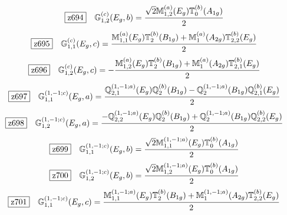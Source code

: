 \documentclass[fleqn,10pt,landscape]{jsarticle}
\begin{document}
\begin{dmath*}
\hspace*{3mm}\fbox{z694}\quad \mathbb{G}_{1,2}^{(c)}(E_{g},b)=\frac{\sqrt{2} \mathbb{M}_{1,2}^{(a)}(E_{g}) \mathbb{T}_{0}^{(b)}(A_{1g})}{2}
\end{dmath*}
\begin{dmath*}
\hspace*{3mm}\fbox{z695}\quad \mathbb{G}_{1,1}^{(c)}(E_{g},c)=\frac{\mathbb{M}_{1,1}^{(a)}(E_{g}) \mathbb{T}_{2}^{(b)}(B_{1g}) + \mathbb{M}_{1}^{(a)}(A_{2g}) \mathbb{T}_{2,2}^{(b)}(E_{g})}{2}
\end{dmath*}
\begin{dmath*}
\hspace*{3mm}\fbox{z696}\quad \mathbb{G}_{1,2}^{(c)}(E_{g},c)=- \frac{\mathbb{M}_{1,2}^{(a)}(E_{g}) \mathbb{T}_{2}^{(b)}(B_{1g}) + \mathbb{M}_{1}^{(a)}(A_{2g}) \mathbb{T}_{2,1}^{(b)}(E_{g})}{2}
\end{dmath*}
\begin{dmath*}
\hspace*{3mm}\fbox{z697}\quad \mathbb{G}_{1,1}^{(1,-1;c)}(E_{g},a)=\frac{\mathbb{Q}_{2,1}^{(1,-1;a)}(E_{g}) \mathbb{Q}_{2}^{(b)}(B_{1g}) - \mathbb{Q}_{2}^{(1,-1;a)}(B_{1g}) \mathbb{Q}_{2,1}^{(b)}(E_{g})}{2}
\end{dmath*}
\begin{dmath*}
\hspace*{3mm}\fbox{z698}\quad \mathbb{G}_{1,2}^{(1,-1;c)}(E_{g},a)=\frac{- \mathbb{Q}_{2,2}^{(1,-1;a)}(E_{g}) \mathbb{Q}_{2}^{(b)}(B_{1g}) + \mathbb{Q}_{2}^{(1,-1;a)}(B_{1g}) \mathbb{Q}_{2,2}^{(b)}(E_{g})}{2}
\end{dmath*}
\begin{dmath*}
\hspace*{3mm}\fbox{z699}\quad \mathbb{G}_{1,1}^{(1,-1;c)}(E_{g},b)=\frac{\sqrt{2} \mathbb{M}_{1,1}^{(1,-1;a)}(E_{g}) \mathbb{T}_{0}^{(b)}(A_{1g})}{2}
\end{dmath*}
\begin{dmath*}
\hspace*{3mm}\fbox{z700}\quad \mathbb{G}_{1,2}^{(1,-1;c)}(E_{g},b)=\frac{\sqrt{2} \mathbb{M}_{1,2}^{(1,-1;a)}(E_{g}) \mathbb{T}_{0}^{(b)}(A_{1g})}{2}
\end{dmath*}
\begin{dmath*}
\hspace*{3mm}\fbox{z701}\quad \mathbb{G}_{1,1}^{(1,-1;c)}(E_{g},c)=\frac{\mathbb{M}_{1,1}^{(1,-1;a)}(E_{g}) \mathbb{T}_{2}^{(b)}(B_{1g}) + \mathbb{M}_{1}^{(1,-1;a)}(A_{2g}) \mathbb{T}_{2,2}^{(b)}(E_{g})}{2}
\end{dmath*}
\end{document}
